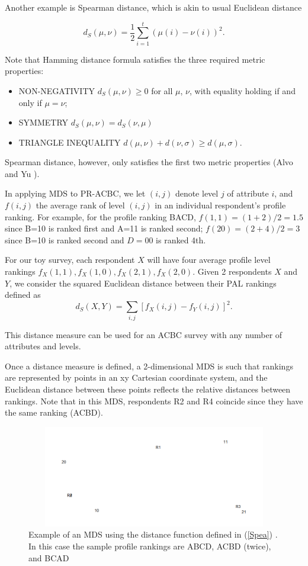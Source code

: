 \documentclass[a4paper, 12pt]{article}
\begin{document}
 
 Another example is Spearman distance, which is akin to usual Euclidean distance

\begin{equation}
d_S{(\mu,\nu)}=\frac{1}{2}\sum_{i=1}^t(\mu(i)-\nu(i))^2.
\end{equation}

{\flushleft Note} that Hamming distance formula satisfies the three required metric properties:

\begin{itemize}
	\item NON-NEGATIVITY $d_S(\mu,\nu)\ge 0$ for all $\mu$, $\nu$, with equality holding if and only if $\mu=\nu$;
	\item SYMMETRY $d_S(\mu,\nu)=d_S(\nu,\mu)$ 
	\item TRIANGLE INEQUALITY $d(\mu,\nu)+d(\nu,\sigma)\ge d(\mu,\sigma)$.
\end{itemize}
{\flushleft Spearman distance}, however, only satisfies the first two metric properties (Alvo and Yu ).

 In applying MDS to PR-ACBC, we let $(i,j)$ denote level $j$ of attribute $i$,  and $f(i,j)$ the average rank of level $(i,j)$ in an individual respondent's profile ranking. For example, for the profile ranking BACD, $f(1,1)=(1+2)/2=1.5$ since B=10 is ranked first and A=11 is ranked second; $f(20)=(2+4)/2=3$ since B=10 is ranked second and $D=00$ is ranked 4th.

 For our toy survey, each respondent $X$ will have four average profile level rankings $f_X(1,1), f_X(1,0), f_X(2,1), f_X(2,0)$.  Given 2 respondents $X$ and $Y$, we consider the squared Euclidean distance between their PAL rankings defined as
\begin{equation}
d_S(X,Y)=\sum_{i,j} [f_X(i,j)-f_Y(i,j)]^2.
\label{Spea}
\end{equation}

{\flushleft This} distance measure can be used for an ACBC survey with any number of attributes and levels.


Once a distance measure is defined, a 2-dimensional MDS is such that rankings are represented by points in an xy Cartesian coordinate system, and the Euclidean distance between these points reflects the relative distances between rankings.   
Note that in this MDS, respondents R2 and R4 coincide since they have the same ranking (ACBD).   

\begin{figure}[!htpb]
	\centering
	\includegraphics[width=6.5in, height=1.75in]{MDS1.png}
	\caption{Example of an MDS using the distance function defined in (\ref{Spea}) . In this case the sample profile rankings are ABCD, ACBD (twice), and BCAD}
	\label{AL}
\end{figure}
\end{document}
